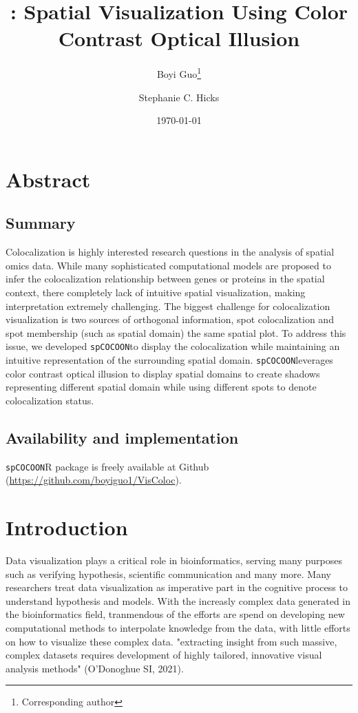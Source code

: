\documentclass[11pt]{article}
\title{\coloc: Spatial Visualization Using Color Contrast Optical Illusion}
\author[1]{Boyi Guo\thanks{Corresponding author}}
\author[1]{Stephanie C. Hicks}
\affil[1]{Department of Biostatistics, Johns Hopkins Bloomberg School of Public Health, MD, USA}
\date{\today}
\newcommand{\fixme}[1]{{\color{red} (#1)}}
\newcommand{\coloc}{\texttt{spCOCOON}}
\begin{document}
\maketitle

\vspace{-.6in}

\section*{Abstract}
\subsection*{Summary}
Colocalization is highly interested research questions in the analysis of spatial omics data. While many sophisticated computational models are proposed to infer the colocalization relationship between genes or proteins in the spatial context, there completely lack of intuitive spatial visualization, making interpretation extremely challenging. The biggest challenge for colocalization visualization is two sources of orthogonal information, spot colocalization and spot membership (such as spatial domain) the same spatial plot. To address this issue, we developed \coloc to display the colocalization while maintaining an intuitive representation of the surrounding spatial domain. \coloc leverages color contrast optical illusion to display spatial domains to create shadows representing different spatial domain while using different spots to denote colocalization status.  

\subsection*{Availability and implementation}
\coloc R package is freely available at Github (\url{https://github.com/boyiguo1/VisColoc}).


\section*{Introduction}
Data visualization plays a critical role in bioinformatics, serving many purposes such as verifying hypothesis, scientific communication and many more. Many researchers treat data visualization as imperative part in the cognitive process to understand hypothesis and models. With the increasly complex data generated in the bioinformatics field, tranmendous of the efforts are spend on developing new computational methods to interpolate knowledge from the data, with little efforts on how to visualize these complex data. "extracting insight from such massive, complex datasets requires development of highly tailored, innovative visual analysis methods" (O'Donoghue SI, 2021). 
\end{document}

